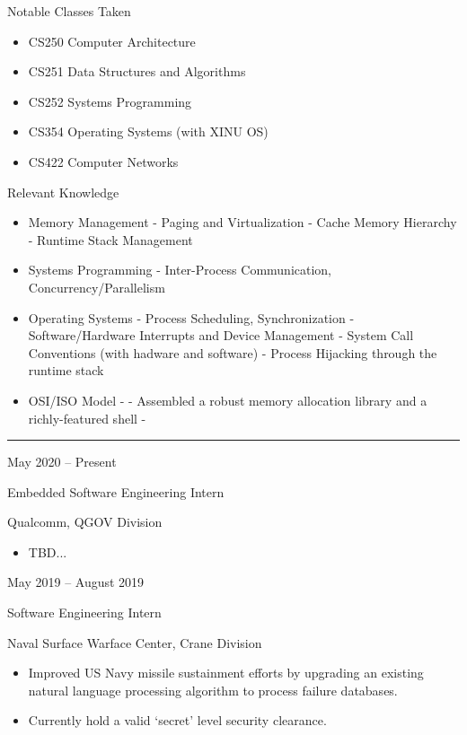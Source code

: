 \documentclass[a4paper]{article}
\newlength{\cvcolumngapwidth}
\newlength{\cvleftcolumnwidth}
\newlength{\cvrightcolumnwidth}
\newcommand{\cvsectionstyle}[1]{{\normalsize\cvsectionfont\textcolor{cvsectioncolor}{#1}}}
\newcommand{\cvtitlestyle}[1]{{\large\cvtitlefont\textcolor{cvtitlecolor}{#1}}}
\newcommand{\cvdurationstyle}[1]{{\small\cvdurationfont\textcolor{cvdurationcolor}{#1}}}
\newcommand{\cvheadingstyle}[1]{{\normalsize\cvheadingfont\textcolor{cvheadingcolor}{#1}}}
\newlength{\cvafteritemskipamount}
\newlength{\cvaftersectionskipamount}
\newlength{\cvaftertitleskipamount}
\newlength{\cvparskip}
\newcommand{\cvsection}[1]{
    \begin{minipage}[t]{\cvleftcolumnwidth}
        \raggedleft\cvsectionstyle{#1}
    \end{minipage}%
    \hspace{\cvcolumngapwidth}%
    \begin{minipage}[t]{\cvrightcolumnwidth}
        \textcolor{cvrulecolor}{\rule{\cvrightcolumnwidth}{0.3mm}}
    \end{minipage}

    \vspace{\cvaftersectionskipamount}
}
\newcommand{\cvitem}[2]{
    \begin{minipage}[t]{\cvleftcolumnwidth}
        \raggedleft #1
    \end{minipage}%
    \hspace{\cvcolumngapwidth}%
    \begin{minipage}[t]{\cvrightcolumnwidth}
        \setlength{\parskip}{\cvparskip} #2
    \end{minipage}

    \vspace{\cvafteritemskipamount}
}
\newcommand{\cvtitle}[1]{
    \cvtitlestyle{#1}

    \vspace{\cvaftertitleskipamount}
    \vspace{-\cvparskip}
}
\begin{document}
\cvitem{
    \cvheadingstyle{Notable Classes Taken}
}{
    \begin{itemize}[leftmargin=*]
      \item CS250 Computer Architecture
      \item CS251 Data Structures and Algorithms
      \item CS252 Systems Programming
      \item CS354 Operating Systems (with XINU OS)
      \item CS422 Computer Networks
    \end{itemize}
}

\cvitem{
    \cvheadingstyle{Relevant Knowledge}
}{
    \begin{itemize}[leftmargin=*]
      \item Memory Management
        \subitem - Paging and Virtualization
        \subitem - Cache Memory Hierarchy
        \subitem - Runtime Stack Management

      \item Systems Programming
        \subitem - Inter-Process Communication, Concurrency/Parallelism

      \item Operating Systems
        \subitem - Process Scheduling, Synchronization
        \subitem - Software/Hardware Interrupts and Device Management
        \subitem - System Call Conventions (with hadware and software)
        \subitem - Process Hijacking through the runtime stack

      \item OSI/ISO Model
        \subitem - 
        \subitem - Assembled a robust memory allocation library and  a richly-featured shell
        \subitem - 
      \end{itemize}
}


\cvsection{WORK EXPERIENCE}

\cvitem{
    \cvdurationstyle{May 2020 -- Present}
}{
    \cvtitle{Embedded Software Engineering Intern}

    Qualcomm, QGOV Division

    \begin{itemize}[leftmargin=*]
        \item TBD...
    \end{itemize}
}

\cvitem{
    \cvdurationstyle{May 2019 -- August 2019}
}{
    \cvtitle{Software Engineering Intern}

    Naval Surface Warface Center, Crane Division

    \begin{itemize}[leftmargin=*]
        \item Improved US Navy missile sustainment efforts by upgrading an existing
natural language processing algorithm to process failure databases.
        \item Currently hold a valid ‘secret’ level security clearance.
    \end{itemize}
}
\end{document}
